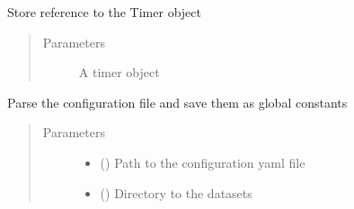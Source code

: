 \documentclass[letterpaper,10pt,english]{sphinxmanual}
\begin{document}
\begin{fulllineitems}
\begin{fulllineitems}
\begin{quote}
\begin{description}
\end{description}\end{quote}

\end{fulllineitems}


\begin{fulllineitems}
\label{\detokenize{eLCS:eLCS.Constants.Constants.referenceTimer}}
Store reference to the Timer object
\begin{quote}\begin{description}
\item[{Parameters}] \leavevmode
{} \textendash{} A timer object

\end{description}\end{quote}

\end{fulllineitems}


\begin{fulllineitems}
\label{\detokenize{eLCS:eLCS.Constants.Constants.setConstants}}
Parse the configuration file and save them as global constants
\begin{quote}\begin{description}
\item[{Parameters}] \leavevmode\begin{itemize}
\item {} 
 () \textendash{} Path to the configuration yaml file

\item {} 
 () \textendash{} Directory to the datasets

\end{itemize}

\end{description}\end{quote}

\end{fulllineitems}


\end{fulllineitems}
\end{document}
